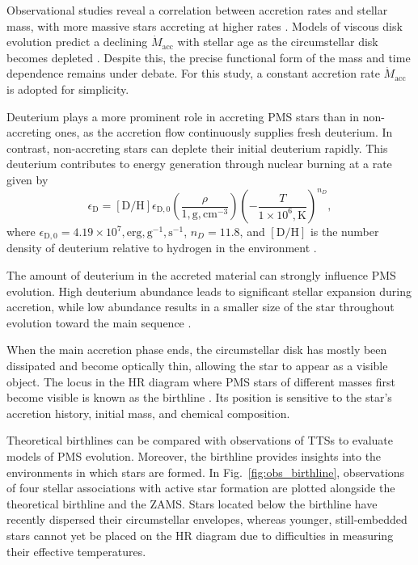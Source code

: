 \documentclass[12pt,a4paper]{article}
\newcommand{\mr}{\mathrm}
\begin{document}
Observational studies reveal a correlation between accretion rates and stellar mass, with more massive stars accreting at higher rates \parencite[e.g.,][]{MuzerolleEtAl2003,ManaraEtAl2017,RugelEtAl2018,LanzafameEtAl2023}. Models of viscous disk evolution predict a declining $\dot{M}_\mr{acc}$ with stellar age as the circumstellar disk becomes depleted \parencite[e.g.,][]{HartmannEtAl1998,GortiHollenbach2009}.  Despite this, the precise functional form of the mass and time dependence remains under debate. For this study, a constant accretion rate $\dot{M}_\mr{acc}$ is adopted for simplicity.

Deuterium plays a more prominent role in accreting PMS stars than in non-accreting ones, as the accretion flow continuously supplies fresh deuterium. In contrast, non-accreting stars can deplete their initial deuterium rapidly. This deuterium contributes to energy generation through nuclear burning at a rate given by
\begin{equation}
\epsilon_\mr{D} = \left[\mr{D/H}\right]\epsilon_\mr{D,0} \left(\frac{\rho}{1,\mr{g,cm^{-3}}}\right) \left(-\frac{T}{1 \times 10^6,\mr{K}}\right)^{n_D},
\end{equation}
where $\epsilon_\mr{D,0} = 4.19 \times 10^7,\mr{erg,g^{-1},s^{-1}}$, $n_D = 11.8$, and $\left[\mr{D/H}\right]$ is the number density of deuterium relative to hydrogen in the environment \parencite[cf. Eq.~11.27 in][]{StahlerPalla2004}.

The amount of deuterium in the accreted material can strongly influence PMS evolution. High deuterium abundance leads to significant stellar expansion during accretion, while low abundance results in a smaller size of the star throughout evolution toward the main sequence \parencite{KunitomoEtAl2017}.

When the main accretion phase ends, the circumstellar disk has mostly been dissipated and become optically thin, allowing the star to appear as a visible object. The locus in the HR diagram where PMS stars of different masses first become visible is known as the birthline \parencite{Stahler1983}. Its position is sensitive to the star's accretion history, initial mass, and chemical composition.

Theoretical birthlines can be compared with observations of TTSs to evaluate models of PMS evolution. Moreover, the birthline provides insights into the environments in which stars are formed. In Fig.~\ref{fig:obs_birthline}, observations of four stellar associations with active star formation are plotted alongside the theoretical birthline and the ZAMS. Stars located below the birthline have recently dispersed their circumstellar envelopes, whereas younger, still-embedded stars cannot yet be placed on the HR diagram due to difficulties in measuring their effective temperatures.
\end{document}

